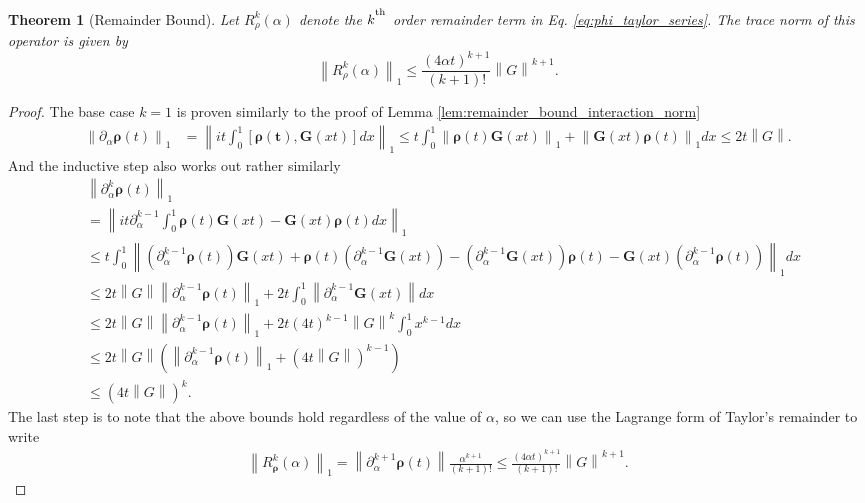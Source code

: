 \documentclass[
 amsmath,amssymb,
 aps,
onecolumn, 
nofootinbib]{revtex4-2}
\newtheorem{theorem}{Theorem}
\newcommand{\norm}[1]{\left\| #1 \right\|}
\newcommand{\ts}{\textsuperscript}
\begin{document}
\begin{theorem}[Remainder Bound]\label{thm:remainder_bound}
    Let $R^k_\rho (\alpha)$ denote the $k^\ts{th}$ order remainder term in Eq. \ref{eq:phi_taylor_series}. The trace norm of this operator is given by
    \begin{equation}
        \norm{R^k_\rho (\alpha)}_1 \le \frac{(4 \alpha t)^{k + 1}}{(k + 1)!} \norm{G}^{k + 1}.
    \end{equation}
\end{theorem}
\begin{proof}
The base case $k = 1$ is proven similarly to the proof of Lemma \ref{lem:remainder_bound_interaction_norm}
\begin{align}
    \norm{\partial_\alpha \boldsymbol{\rho}(t)}_1 &=  \norm{i t\int_0^1 [\boldsymbol{\rho(t)}, \boldsymbol{G}(x t)] dx }_1 \le t \int_0^1 \norm{\boldsymbol{\rho}(t) \boldsymbol{G}(xt)}_1 + \norm{\boldsymbol{G}(xt) \boldsymbol{\rho}(t)}_1 dx \le 2 t \norm{G}.
\end{align}
And the inductive step also works out rather similarly
\begin{align}
    &\norm{\partial_\alpha^{k} \boldsymbol{\rho}(t)}_1 \\
    &= \norm{i t \partial_{\alpha}^{k - 1} \int_0^1 \boldsymbol{\rho}(t) \boldsymbol{G}(xt) - \boldsymbol{G}(xt) \boldsymbol{\rho}(t) dx }_1 \\
    &\le t \int_0^1 \norm{(\partial_\alpha^{k - 1} \boldsymbol{\rho}(t) ) \boldsymbol{G}(xt) + \boldsymbol{\rho}(t) (\partial_\alpha^{k - 1} \boldsymbol{G}(xt)) - (\partial_\alpha^{k -1} \boldsymbol{G}(xt)) \boldsymbol{\rho}(t) - \boldsymbol{G}(xt) (\partial_\alpha^{k-  1} \boldsymbol{\rho}(t))}_1 dx \\
    &\le 2 t \norm{G} \norm{\partial_\alpha^{k - 1} \boldsymbol{\rho}(t)}_1 + 2 t \int_0^1 \norm{\partial_{\alpha}^{k - 1} \boldsymbol{G}(xt)} dx \\
    &\le 2 t \norm{G} \norm{\partial_\alpha^{k - 1} \boldsymbol{\rho}(t)}_1 + 2 t (4 t)^{k - 1} \norm{G}^k \int_0^1 x^{k - 1} d x \\
    &\le 2 t \norm{G} \left( \norm{\partial_\alpha^{k - 1} \boldsymbol{\rho}(t)}_1 + (4t \norm{G})^{k - 1} \right) \\
    &\le \left(4 t \norm{G} \right)^k.
\end{align}
The last step is to note that the above bounds hold regardless of the value of $\alpha$, so we can use the Lagrange form of Taylor's remainder to write
\begin{align}
    \norm{R_{\boldsymbol{\rho}}^k (\alpha)}_1 = \norm{\partial_\alpha^{k + 1} \boldsymbol{\rho}(t) } \frac{\alpha^{k + 1}}{(k + 1)!} \le \frac{(4 \alpha t)^{k + 1}}{(k + 1)!}  \norm{G}^{k + 1}.
\end{align}
\end{proof}
\end{document}
